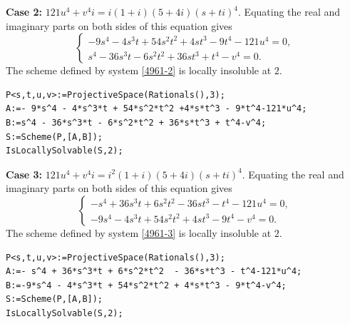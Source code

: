 \documentclass[a4paper,12pt,english,reqno]{amsart}
\begin{document}
{\bf Case 2:} $121u^4+v^4i=i(1+i)(5+ 4i)(s+ti)^4$.  Equating the real and imaginary parts on both sides of this equation gives
\begin{equation}\label{4961-2}
\begin{cases}
-9s^4 - 4s^3t + 54s^2t^2 + 4st^3 - 9t^4 - 121u^4=0,\\
s^4 - 36s^3t - 6s^2t^2 + 36st^3 + t^4 - v^4=0.
\end{cases}
\end{equation}
The scheme defined by system \eqref{4961-2} is locally insoluble at $2$.


\begin{lstlisting}
P<s,t,u,v>:=ProjectiveSpace(Rationals(),3);
A:=- 9*s^4 - 4*s^3*t + 54*s^2*t^2 +4*s*t^3 - 9*t^4-121*u^4;
B:=s^4 - 36*s^3*t - 6*s^2*t^2 + 36*s*t^3 + t^4-v^4;
S:=Scheme(P,[A,B]);
IsLocallySolvable(S,2);
\end{lstlisting}


{\bf Case 3:} $121u^4+v^4i=i^2(1+i)(5+ 4i)(s+ti)^4$.  Equating the real and imaginary parts on both sides of this equation gives
\begin{equation}\label{4961-3}
\begin{cases}
-s^4 + 36s^3t + 6s^2t^2 - 36st^3 - t^4 - 121u^4=0,\\
-9s^4 - 4s^3t + 54s^2t^2 + 4st^3 - 9t^4 - v^4=0.
\end{cases}
\end{equation}
The scheme defined by system \eqref{4961-3} is locally insoluble at $2$.

\begin{lstlisting}
P<s,t,u,v>:=ProjectiveSpace(Rationals(),3);
A:=- s^4 + 36*s^3*t + 6*s^2*t^2  - 36*s*t^3 - t^4-121*u^4;
B:=-9*s^4 - 4*s^3*t + 54*s^2*t^2 + 4*s*t^3 - 9*t^4-v^4;
S:=Scheme(P,[A,B]);
IsLocallySolvable(S,2);
\end{lstlisting}
\end{document}
